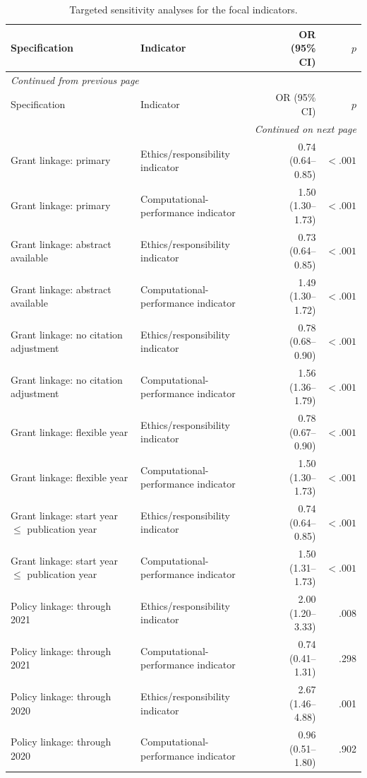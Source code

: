 \documentclass[11pt]{article}
\begin{document}
\begin{longtable}{p{5.0cm}p{4.0cm}rr}
\caption{Targeted sensitivity analyses for the focal indicators.}\label{tab:s2-focal-sensitivities}\\
\toprule
Specification & Indicator & OR (95\% CI) & $p$ \\
\midrule
\endfirsthead
\multicolumn{4}{l}{\small\itshape Continued from previous page} \\
\toprule
Specification & Indicator & OR (95\% CI) & $p$ \\
\midrule
\endhead
\midrule
\multicolumn{4}{r}{\small\itshape Continued on next page} \\
\endfoot
\bottomrule
\endlastfoot
Grant linkage: primary & Ethics/responsibility indicator & 0.74 (0.64--0.85) & $<.001$ \\
Grant linkage: primary & Computational-performance indicator & 1.50 (1.30--1.73) & $<.001$ \\
Grant linkage: abstract available & Ethics/responsibility indicator & 0.73 (0.64--0.85) & $<.001$ \\
Grant linkage: abstract available & Computational-performance indicator & 1.49 (1.30--1.72) & $<.001$ \\
Grant linkage: no citation adjustment & Ethics/responsibility indicator & 0.78 (0.68--0.90) & $<.001$ \\
Grant linkage: no citation adjustment & Computational-performance indicator & 1.56 (1.36--1.79) & $<.001$ \\
Grant linkage: flexible year & Ethics/responsibility indicator & 0.78 (0.67--0.90) & $<.001$ \\
Grant linkage: flexible year & Computational-performance indicator & 1.50 (1.30--1.73) & $<.001$ \\
Grant linkage: start year $\leq$ publication year & Ethics/responsibility indicator & 0.74 (0.64--0.85) & $<.001$ \\
Grant linkage: start year $\leq$ publication year & Computational-performance indicator & 1.50 (1.31--1.73) & $<.001$ \\
Policy linkage: through 2021 & Ethics/responsibility indicator & 2.00 (1.20--3.33) & .008 \\
Policy linkage: through 2021 & Computational-performance indicator & 0.74 (0.41--1.31) & .298 \\
Policy linkage: through 2020 & Ethics/responsibility indicator & 2.67 (1.46--4.88) & .001 \\
Policy linkage: through 2020 & Computational-performance indicator & 0.96 (0.51--1.80) & .902 \\

\end{longtable}
\end{document}

